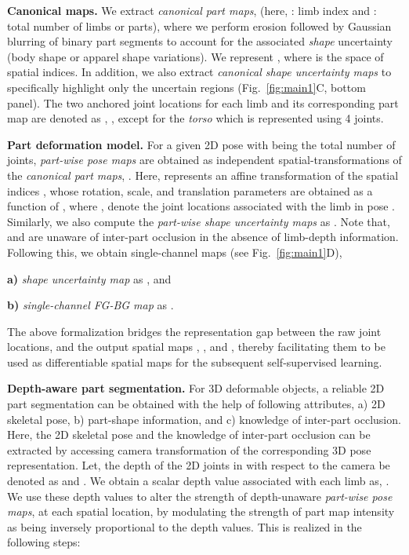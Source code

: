 \vspace{1.5mm}
\textbf{Canonical maps.} We extract \textit{canonical part maps},  (here, : limb index and : total number of limbs or parts), where we perform erosion followed by Gaussian blurring of binary part segments to account for the associated \textit{shape} uncertainty (\ie body shape or apparel shape variations). We represent , 
where  is the space of spatial indices.  In addition, we also extract \textit{canonical shape uncertainty maps}  to specifically highlight only the uncertain regions (Fig.~\ref{fig:main1}{\color{red}C}, bottom panel). The two anchored joint locations for each limb  and its corresponding part map  are denoted as ,  , except for the \textit{torso} which is represented using 4 joints. 


\vspace{1.5mm}
\textbf{Part deformation model.} For a given 2D pose  with  being the total number of joints, \textit{part-wise pose maps} are obtained as independent spatial-transformations of the \textit{canonical part maps}, \ie . Here,  represents an affine transformation of the spatial indices , whose rotation, scale, and translation parameters are obtained as a function of , where ,  denote the joint locations associated with the limb  in pose . Similarly, we also compute the \textit{part-wise shape uncertainty maps} as . Note that,  and  are unaware of inter-part occlusion in the absence of limb-depth information. Following this, we obtain single-channel maps (see Fig.~\ref{fig:main1}{\color{red}D}), \ie 

\textbf{a)} \textit{shape uncertainty map} as , and 

\textbf{b)} \textit{single-channel FG-BG map} as . 

The above formalization bridges the representation gap between the raw joint locations,  and the output spatial maps , , and , thereby facilitating them to be used as differentiable spatial maps for the subsequent self-supervised learning. 









\vspace{1.5mm}
\textbf{Depth-aware part segmentation.} For 3D deformable objects, a reliable 2D part segmentation can be obtained with the help of following attributes, \ie a) 2D skeletal pose, b) part-shape information, and c) knowledge of inter-part occlusion. Here, the 2D skeletal pose and the knowledge of inter-part occlusion can be extracted by accessing camera transformation of the corresponding 3D pose representation. Let, the depth of the 2D joints in  with respect to the camera be denoted as  and .  We obtain a scalar depth value associated with each limb  as, .  
We use these depth values to alter the strength of depth-unaware \textit{part-wise pose maps},  at each spatial location,  by modulating the strength of part map intensity as being inversely proportional to the depth values. This is realized in the following steps: 

